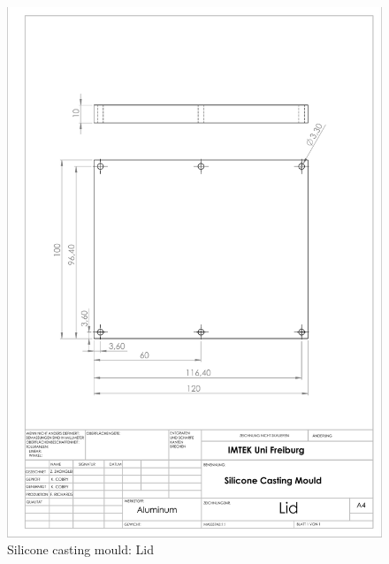 \begin{figure}[h]%
\centering
\includegraphics[width=1\textwidth]{figures/appendix/siliconecastingmouldlid}%
\caption{Silicone casting mould: Lid}%
\label{siliconecastingmouldlid}%
\end{figure}

\clearpage

